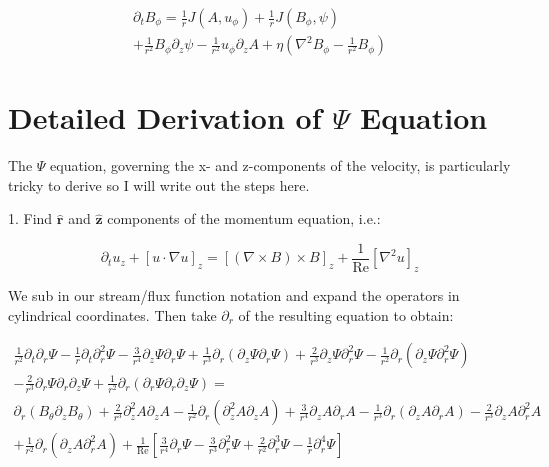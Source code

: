 \documentclass{paper}
\newcommand{\beq}{\begin{equation}}
\newcommand{\eeq}{\end{equation}}
\newcommand{\uphi}{\ensuremath{u_\phi}}
\newcommand{\rhat}{\ensuremath{\mathbf{\hat{r}}}}
\newcommand{\zhat}{\ensuremath{\mathbf{\hat{z}}}}
\newcommand\reye{\mathrm{Re}}
\begin{document}
\begin{multline}
  \label{eq:By} %
\partial_t B_\phi = \frac{1}{r} J(A, \uphi) + \frac{1}{r} J(B_\phi, \psi)\\
+ \frac{1}{r^2} B_\phi \partial_z \psi - \frac{1}{r^2} \uphi \partial_z A + \eta \left(\nabla^2 B_\phi - \frac{1}{r^2} B_\phi \right)
\end{multline}

\section{Detailed Derivation of $\Psi$ Equation}
The $\Psi$ equation, governing the x- and z-components of the velocity, is particularly tricky to derive so I will write out the steps here.

1. Find $\rhat$ and $\zhat$ components of the momentum equation, i.e.:

\beq
\partial_t u_z + \left[u \cdot \nabla u \right]_z = \left[ \left( \nabla \times B \right) \times B \right]_z + \frac{1}{\reye}\left[ \nabla^2 u \right] _z
\eeq

We sub in our stream/flux function notation and expand the operators in cylindrical coordinates. Then take $\partial_r$ of the resulting equation to obtain:

\begin{multline}
\frac{1}{r^2} \partial_t \partial_r \Psi - \frac{1}{r} \partial_t \partial_r^2 \Psi - \frac{3}{r^4}\partial_z \Psi \partial_r \Psi + \frac{1}{r^3} \partial_r \left( \partial_z \Psi \partial_r \Psi \right) + \frac{2}{r^3} \partial_z \Psi \partial_r^2 \Psi - \frac{1}{r^2} \partial_r \left(\partial_z \Psi \partial_r^2 \Psi \right)\\
- \frac{2}{r^3} \partial_r \Psi \partial_r\partial_z \Psi + \frac{1}{r^2} \partial_r \left(\partial_r \Psi \partial_r \partial_z \Psi\right) = \\
\partial_r\left(B_\theta \partial_z B_\theta\right) + \frac{2}{r^3} \partial_z^2 A \partial_z A - \frac{1}{r^2} \partial_r \left(\partial_z^2 A \partial_z A\right) + \frac{3}{r^4} \partial_z A \partial_r A - \frac{1}{r^3} \partial_r \left(\partial_z A \partial_r A \right) - \frac{2}{r^3} \partial_z A \partial_r^2 A \\
+ \frac{1}{r^2} \partial_r \left(\partial_z A \partial_r^2 A \right) 
+ \frac{1}{\reye} \left[\frac{3}{r^4} \partial_r \Psi - \frac{3}{r^3} \partial_r^2 \Psi + \frac{2}{r^2} \partial_r^3 \Psi - \frac{1}{r} \partial_r^4 \Psi\right]
\end{multline}
\end{document}
